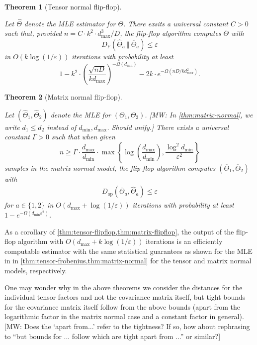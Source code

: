 \documentclass[aos]{imsart}
\newtheorem{theorem}{Theorem}[section]
\theoremstyle{definition}
\numberwithin{equation}{section}
\newcommand{\otheta}{\overline{\Theta}}
\newcommand{\htheta}{\widehat{\Theta}}
\newcommand{\eps}{\varepsilon}
\newcommand{\DF}{D_{\operatorname{F}}}
\newcommand{\Dop}{D_{\operatorname{op}}}
\def\dmin{d_{\min}}
\def\dmax{d_{\max}}
\newcommand{\MW}[1]{{\color{red}[MW: #1]}}
\newcommand{\MW}[1]{{}}
\begin{document}
\newcommand{\TensorFlop}{
	Let $\htheta$ denote the MLE estimator for $\Theta$. There exsits a universal constant $C > 0$ such that,  provided $n = C \cdot k^2 \cdot \dmax^3/D$, the flip-flop algorithm computes $\otheta$ with
	$$ \DF(\htheta_a \ \Vert  \ \otheta_a) \leq \eps $$
	in $O(k \log(1/\eps))$ iterations with probability at least
	$$ 1 - k^2 \cdot \left( \dfrac{\sqrt{nD}}{k \dmax} \right)^{-\Omega(\dmin)} - 2k \cdot e^{- \Omega(nD/k \dmax^2)}.$$}

\begin{theorem}[Tensor normal flip-flop]\label{thm:tensor-flipflop}
\TensorFlop
\end{theorem}

\newcommand{\MatrixFlop}{
Let $(\widehat{\Theta}_1,\widehat{\Theta}_2)$ denote the MLE for $(\Theta_1,\Theta_2)$.
\MW{In \cref{thm:matrix-normal}, we write $d_1 \leq d_2$ instead of $\dmin,\dmax$. Should unify.}
There exists a universal constant $\Gamma > 0$ such that when given
$$n \geq \Gamma \cdot \dfrac{\dmax}{\dmin} \cdot \max\left\{ \log\left( \dfrac{\dmax}{\dmin} \right), \dfrac{\log^2 \dmin}{\varepsilon^2} \right\}$$
samples in the matrix normal model, the flip-flop algorithm computes $(\overline{\Theta}_1,\overline{\Theta}_2)$ with
\begin{align*}
  \Dop(\overline{\Theta}_a, \widehat{\Theta}_a) \leq \eps
\end{align*}
for $a\in\{1,2\}$ in $O\left(\dmax +  \log(1/\varepsilon) \right)$ iterations with probability at least $1 - e^{- \Omega(\dmin \varepsilon^2)}$.
}

\begin{theorem}[Matrix normal flip-flop]\label{thm:matrix-flipflop}
\MatrixFlop\end{theorem}
As a corollary of \cref{thm:tensor-flipflop,thm:matrix-flipflop}, the output of the flip-flop algorithm with $O\left(\dmax + k \log(1/\varepsilon)  \right)$ iterations is an efficiently computable estimator with the same statistical guarantees as shown for the MLE in in \cref{thm:tensor-frobenius,thm:matrix-normal} for the tensor and matrix normal models, respectively.

One may wonder why in the above theorems we consider the distances for the individual tensor factors and not the covariance matrix itself, but tight bounds for the covariance matrix itself follow from the above bounds (apart from the logarithmic factor in the matrix normal case and a constant factor in general).
\MW{Does the `apart from...' refer to the tightness? If so, how about rephrasing to ``but bounds for ... follow which are tight apart from ...'' or similar?}
\end{document}
